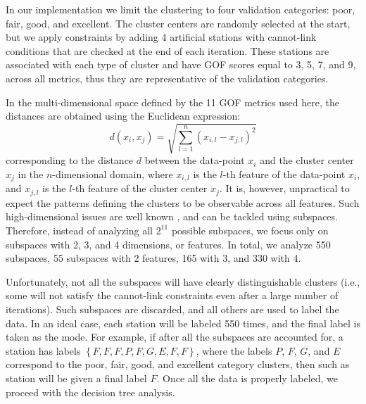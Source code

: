 In our implementation we limit the clustering to four validation categories: poor, fair, good, and excellent. The cluster centers are randomly selected at the start, but we apply constraints by adding 4 artificial stations with cannot-link conditions that are checked at the end of each iteration. These stations are associated with each type of cluster and have GOF scores equal to 3, 5, 7, and 9, across all metrics, thus they are representative of the validation categories. 

In the multi-dimensional space defined by the 11 GOF metrics used here, the distances are obtained using the Euclidean expression:
% 
\begin{equation}
	d(x_i, x_j) = \sqrt{ \sum_{l=1}^{n} \left( x_{i,l} - x_{j,l} \right)^2 } 
\end{equation}
% 
corresponding to the distance $d$ between the data-point $x_i$ and the cluster center $x_j$ in the $n$-dimensional domain, where $x_{i,l}$ is the $l$-th feature of the data-point $x_i$, and $x_{j,l}$ is the $l$-th feature of the cluster center $x_j$. It is, however, unpractical to expect the patterns defining the clusters to be observable across all features. Such high-dimensional issues are well known \citep[see, for instance,][]{Parsons_2004_ACM, Dy_2004_MLR}, and can be tackled using subspaces. Therefore, instead of analyzing all $2^{11}$ possible subspaces, we focus only on subspaces with 2, 3, and 4 dimensions, or features. In total, we analyze 550 subspaces, 55 subspaces with 2 features, 165 with 3, and 330 with 4.

Unfortunately, not all the subspaces will have clearly distinguishable clusters (i.e., some will not satisfy the cannot-link constraints even after a large number of iterations). Such subspaces are discarded, and all others are used to label the data. In an ideal case, each station will be labeled 550 times, and the final label is taken as the mode. For example, if after all the subspaces are accounted for, a station has labels $\left\{F, F, F, P, F, G, E, F, F\right\}$, where the labels $P$, $F$, $G$, and $E$ correspond to the poor, fair, good, and excellent category clusters, then such as station will be given a final label $F$. Once all the data is properly labeled, we proceed with the decision tree analysis.
